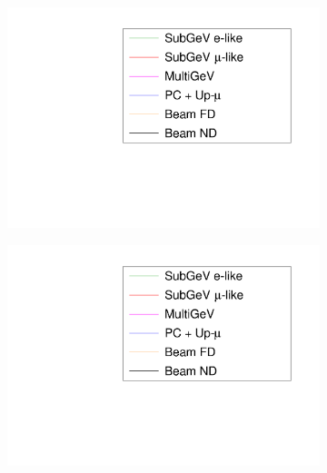 \begin{figure}[h]
  \begin{subfigure}[t]{0.5\textwidth}
    \includegraphics[width=\textwidth, trim={0mm 0mm 0mm 0mm}, clip,page=2]{Figures/OA/LLHScans_Systs.pdf}
  \end{subfigure}%
  \begin{subfigure}[t]{0.5\textwidth}
    \includegraphics[width=\textwidth, trim={0mm 0mm 0mm 0mm}, clip,page=5]{Figures/OA/LLHScans_Systs.pdf}
  \end{subfigure}
  \begin{subfigure}[t]{0.5\textwidth}

\end{subfigure}
\end{figure}
